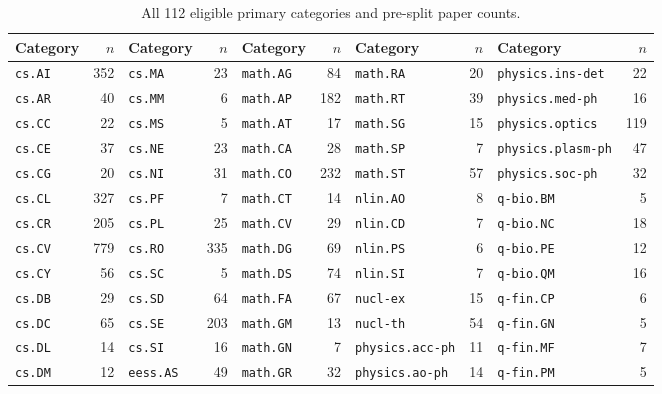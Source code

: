 \documentclass[10pt]{article}
\begin{document}
\begin{table}[H]
  \centering
  \caption{All 112 eligible primary categories and pre-split paper counts.}
  \label{tab:classes}
  \fontsize{8.0}{8.4}\selectfont
  \setlength{\tabcolsep}{2.6pt}
  \begin{tabular}{lr lr lr lr lr}
    \toprule
    Category & $n$ & Category & $n$ & Category & $n$ & Category & $n$ & Category & $n$ \\
    \midrule
    \texttt{cs.AI} & 352 & \texttt{cs.MA} & 23 & \texttt{math.AG} & 84 & \texttt{math.RA} & 20 & \texttt{physics.ins-det} & 22 \\
    \texttt{cs.AR} & 40 & \texttt{cs.MM} & 6 & \texttt{math.AP} & 182 & \texttt{math.RT} & 39 & \texttt{physics.med-ph} & 16 \\
    \texttt{cs.CC} & 22 & \texttt{cs.MS} & 5 & \texttt{math.AT} & 17 & \texttt{math.SG} & 15 & \texttt{physics.optics} & 119 \\
    \texttt{cs.CE} & 37 & \texttt{cs.NE} & 23 & \texttt{math.CA} & 28 & \texttt{math.SP} & 7 & \texttt{physics.plasm-ph} & 47 \\
    \texttt{cs.CG} & 20 & \texttt{cs.NI} & 31 & \texttt{math.CO} & 232 & \texttt{math.ST} & 57 & \texttt{physics.soc-ph} & 32 \\
    \texttt{cs.CL} & 327 & \texttt{cs.PF} & 7 & \texttt{math.CT} & 14 & \texttt{nlin.AO} & 8 & \texttt{q-bio.BM} & 5 \\
    \texttt{cs.CR} & 205 & \texttt{cs.PL} & 25 & \texttt{math.CV} & 29 & \texttt{nlin.CD} & 7 & \texttt{q-bio.NC} & 18 \\
    \texttt{cs.CV} & 779 & \texttt{cs.RO} & 335 & \texttt{math.DG} & 69 & \texttt{nlin.PS} & 6 & \texttt{q-bio.PE} & 12 \\
    \texttt{cs.CY} & 56 & \texttt{cs.SC} & 5 & \texttt{math.DS} & 74 & \texttt{nlin.SI} & 7 & \texttt{q-bio.QM} & 16 \\
    \texttt{cs.DB} & 29 & \texttt{cs.SD} & 64 & \texttt{math.FA} & 67 & \texttt{nucl-ex} & 15 & \texttt{q-fin.CP} & 6 \\
    \texttt{cs.DC} & 65 & \texttt{cs.SE} & 203 & \texttt{math.GM} & 13 & \texttt{nucl-th} & 54 & \texttt{q-fin.GN} & 5 \\
    \texttt{cs.DL} & 14 & \texttt{cs.SI} & 16 & \texttt{math.GN} & 7 & \texttt{physics.acc-ph} & 11 & \texttt{q-fin.MF} & 7 \\
    \texttt{cs.DM} & 12 & \texttt{eess.AS} & 49 & \texttt{math.GR} & 32 & \texttt{physics.ao-ph} & 14 & \texttt{q-fin.PM} & 5 \\

\end{tabular}
\end{table}
\end{document}
